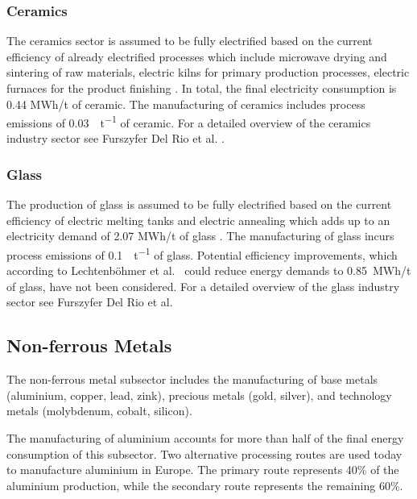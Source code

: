 \subsubsection*{Ceramics}

The ceramics sector is assumed to be fully electrified based on the current
efficiency of already electrified processes which include microwave drying and
sintering of raw materials, electric kilns for primary production processes,
electric furnaces for the product finishing . In total, the final
electricity consumption is 0.44 MWh/t of ceramic. The manufacturing of ceramics
includes process emissions of \SI{0.03}{\tco\per\tonne} of ceramic. For a
detailed overview of the ceramics industry sector see Furszyfer Del Rio et
al. .

\subsubsection*{Glass}

The production of glass is assumed to be fully electrified based on the current
efficiency of electric melting tanks and electric annealing which adds up to an
electricity demand of 2.07 MWh\el/t of glass
. The manufacturing of glass incurs
process emissions of \SI{0.1}{\tco\per\tonne} of glass. Potential efficiency
improvements, which according to Lechtenböhmer et al.~
could reduce energy demands to 0.85~MWh\el/t of glass, have not been considered.
For a detailed overview of the glass industry sector see Furszyfer Del Rio et
al.~

\subsection{Non-ferrous Metals}
\label{sec:si:industry:nfm}

The non-ferrous metal subsector includes the manufacturing of base metals
(aluminium, copper, lead, zink), precious metals (gold, silver), and technology
metals (molybdenum, cobalt, silicon).

The manufacturing of aluminium accounts for more than half of the final energy
consumption of this subsector. Two alternative processing routes are
used today to manufacture aluminium in Europe. The primary route represents 40\%
of the aluminium production, while the secondary route represents the remaining
60\%.

